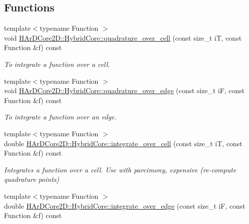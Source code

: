 \subsection*{Functions}
\begin{DoxyCompactItemize}
\item 
\mbox{\label{group__HybridCore_ga3c33c8cec55dbe2d8873e53fcd43d01f}} 
{\footnotesize template$<$typename Function $>$ }\\void \hyperlink{group__HybridCore_ga3c33c8cec55dbe2d8873e53fcd43d01f}{H\+Ar\+D\+Core2\+D\+::\+Hybrid\+Core\+::quadrature\+\_\+over\+\_\+cell} (const size\+\_\+t iT, const Function \&f) const
\begin{DoxyCompactList}\small\item\em To integrate a function over a cell. \end{DoxyCompactList}\item 
\mbox{\label{group__HybridCore_gafbf9c61f2d929331197ba971b52b8710}} 
{\footnotesize template$<$typename Function $>$ }\\void \hyperlink{group__HybridCore_gafbf9c61f2d929331197ba971b52b8710}{H\+Ar\+D\+Core2\+D\+::\+Hybrid\+Core\+::quadrature\+\_\+over\+\_\+edge} (const size\+\_\+t iF, const Function \&f) const
\begin{DoxyCompactList}\small\item\em To integrate a function over an edge. \end{DoxyCompactList}\item 
\mbox{\label{group__HybridCore_ga64ffbc44306e06018efe3cea5a62f652}} 
{\footnotesize template$<$typename Function $>$ }\\double \hyperlink{group__HybridCore_ga64ffbc44306e06018efe3cea5a62f652}{H\+Ar\+D\+Core2\+D\+::\+Hybrid\+Core\+::integrate\+\_\+over\+\_\+cell} (const size\+\_\+t iT, const Function \&f) const
\begin{DoxyCompactList}\small\item\em Integrates a function over a cell. Use with parcimony, expensive (re-\/compute quadrature points) \end{DoxyCompactList}\item 
\mbox{\label{group__HybridCore_ga03f276ea9c905d64662c39b7555d560c}} 
{\footnotesize template$<$typename Function $>$ }\\double \hyperlink{group__HybridCore_ga03f276ea9c905d64662c39b7555d560c}{H\+Ar\+D\+Core2\+D\+::\+Hybrid\+Core\+::integrate\+\_\+over\+\_\+edge} (const size\+\_\+t iF, const Function \&f) const

\end{DoxyCompactItemize}
